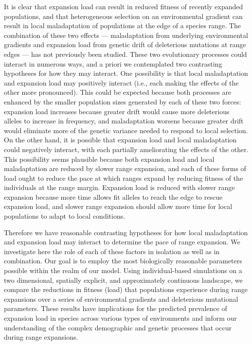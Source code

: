

It is clear that expansion load can result in reduced fitness of recently expanded populations, and that heterogeneous selection on an environmental gradient can result in local maladaptation of populations at the edge of a species range. The combination of these two effects --- maladaptation from underlying environmental gradients and expansion load from genetic drift of deleterious mutations at range edges --- has not previously been studied. These two evolutionary processes could interact in numerous ways, and a priori we contemplated two contrasting hypotheses for how they may interact. One possibility is that local maladaptation and expansion load may positively interact (i.e., each making the effects of the other more pronounced). This could be expected because both processes are enhanced by the smaller population sizes generated by each of these two forces: expansion load increases because greater drift would cause more deleterious alleles to increase in frequency, and maladaptation worsens because greater drift would eliminate more of the genetic variance needed to respond to local selection. On the other hand, it is possible that expansion load and local maladaptation could negatively interact, with each partially ameliorating the effects of the other. This possibility seems plausible because both expansion load and local maladaptation are reduced by slower range expansion, and each of these forms of load ought to reduce the pace at which ranges expand by reducing fitness of the individuals at the range margin. Expansion load is reduced with slower range expansion because more time allows fit alleles to reach the edge to rescue expansion load, and slower range expansion should allow more time for local populations to adapt to local conditions.

Therefore we have reasonable contrasting hypotheses for how local maladaptation and expansion load may interact to determine the pace of range expansion. We investigate here the role of each of these factors in isolation as well as in combination. Our goal is to employ the most biologically reasonable parameters possible within the realm of our model. Using individual-based simulations on a two dimensional, spatially explicit, and approximately continuous landscape, we compare the reductions in fitness (load) that populations experience during range expansions over a series of environmental gradients and deleterious mutational parameters. These results have implications for the predicted prevalence of expansion load in species across various types of environments and inform our understanding of the complex demographic and genetic processes that occur during range expansions. 


